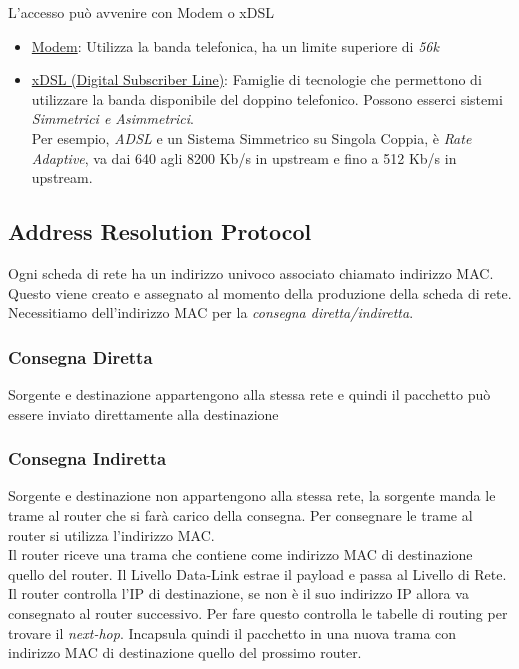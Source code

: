\documentclass{article}
\begin{document}
                L'accesso può avvenire con Modem o xDSL
                \begin{itemize}
                    \item \underline{Modem}: Utilizza la banda telefonica, ha un limite superiore di \textit{56k} 
                    \item \underline{xDSL (Digital Subscriber Line)}: Famiglie di tecnologie che permettono di utilizzare la banda disponibile del doppino telefonico. Possono esserci sistemi \textit{Simmetrici e Asimmetrici}.\\
                          Per esempio, \textit{ADSL} e un Sistema Simmetrico su Singola Coppia, è \textit{Rate Adaptive}, va dai 640 agli 8200 Kb/s in upstream e fino a 512 Kb/s in upstream.  
                \end{itemize}

        \subsection{Address Resolution Protocol}
            Ogni scheda di rete ha un indirizzo univoco associato chiamato indirizzo MAC. Questo viene creato e assegnato al momento della produzione della scheda di rete. Necessitiamo dell'indirizzo MAC per la \textit{consegna diretta/indiretta}.

            \subsubsection{Consegna Diretta}
                Sorgente e destinazione appartengono alla stessa rete e quindi il pacchetto può essere inviato direttamente alla destinazione

            \subsubsection{Consegna Indiretta}
                Sorgente e destinazione non appartengono alla stessa rete, la sorgente manda le trame al router che si farà carico della consegna. Per consegnare le trame al router si utilizza l'indirizzo MAC. \\
                Il router riceve una trama che contiene come indirizzo MAC di destinazione quello del router. Il Livello Data-Link estrae il payload e passa al Livello di Rete. \\
                Il router controlla l'IP di destinazione, se non è il suo indirizzo IP allora va consegnato al router successivo. Per fare questo controlla le tabelle di routing per trovare il \textit{next-hop}. Incapsula quindi il pacchetto in una nuova trama con indirizzo MAC di destinazione quello del prossimo router.
                
\end{document}
